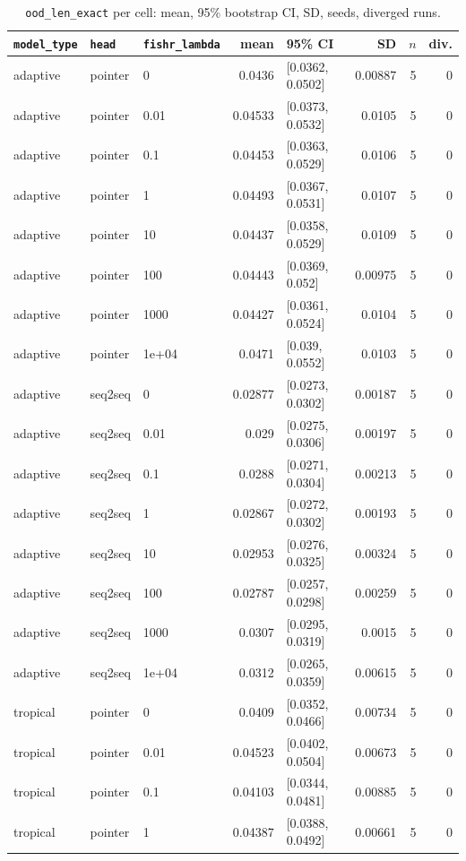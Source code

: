 \documentclass[10pt]{article}
\begin{document}
{\small
\begin{longtable}{lllrlrrr}
\caption{\texttt{ood\_len\_exact} per cell: mean, 95\% bootstrap CI, SD, seeds, diverged runs.}\label{tab:summary-ood_len_exact}\\
\toprule
\texttt{model\_type} & \texttt{head} & \texttt{fishr\_lambda} & mean & 95\% CI & SD & $n$ & div.\\
\midrule
\endhead
adaptive & pointer & 0 & 0.0436 & [0.0362, 0.0502] & 0.00887 & 5 & 0\\
adaptive & pointer & 0.01 & 0.04533 & [0.0373, 0.0532] & 0.0105 & 5 & 0\\
adaptive & pointer & 0.1 & 0.04453 & [0.0363, 0.0529] & 0.0106 & 5 & 0\\
adaptive & pointer & 1 & 0.04493 & [0.0367, 0.0531] & 0.0107 & 5 & 0\\
adaptive & pointer & 10 & 0.04437 & [0.0358, 0.0529] & 0.0109 & 5 & 0\\
adaptive & pointer & 100 & 0.04443 & [0.0369, 0.052] & 0.00975 & 5 & 0\\
adaptive & pointer & 1000 & 0.04427 & [0.0361, 0.0524] & 0.0104 & 5 & 0\\
adaptive & pointer & 1e+04 & 0.0471 & [0.039, 0.0552] & 0.0103 & 5 & 0\\
adaptive & seq2seq & 0 & 0.02877 & [0.0273, 0.0302] & 0.00187 & 5 & 0\\
adaptive & seq2seq & 0.01 & 0.029 & [0.0275, 0.0306] & 0.00197 & 5 & 0\\
adaptive & seq2seq & 0.1 & 0.0288 & [0.0271, 0.0304] & 0.00213 & 5 & 0\\
adaptive & seq2seq & 1 & 0.02867 & [0.0272, 0.0302] & 0.00193 & 5 & 0\\
adaptive & seq2seq & 10 & 0.02953 & [0.0276, 0.0325] & 0.00324 & 5 & 0\\
adaptive & seq2seq & 100 & 0.02787 & [0.0257, 0.0298] & 0.00259 & 5 & 0\\
adaptive & seq2seq & 1000 & 0.0307 & [0.0295, 0.0319] & 0.0015 & 5 & 0\\
adaptive & seq2seq & 1e+04 & 0.0312 & [0.0265, 0.0359] & 0.00615 & 5 & 0\\
tropical & pointer & 0 & 0.0409 & [0.0352, 0.0466] & 0.00734 & 5 & 0\\
tropical & pointer & 0.01 & 0.04523 & [0.0402, 0.0504] & 0.00673 & 5 & 0\\
tropical & pointer & 0.1 & 0.04103 & [0.0344, 0.0481] & 0.00885 & 5 & 0\\
tropical & pointer & 1 & 0.04387 & [0.0388, 0.0492] & 0.00661 & 5 & 0\\

\end{longtable}}
\end{document}
